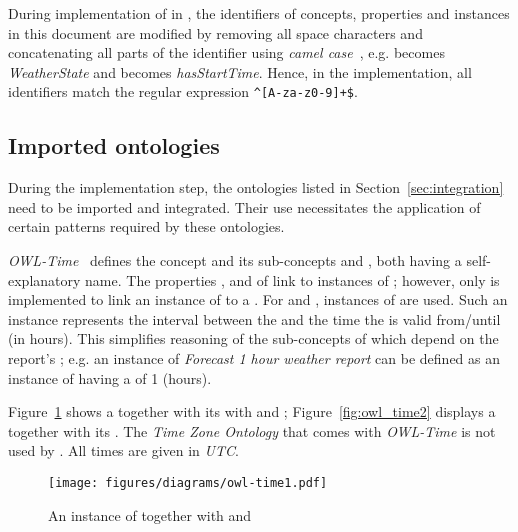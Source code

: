 During implementation of \smarthomeweather in , the identifiers of concepts, properties and instances in this document are modified by removing all space characters and concatenating all parts of the identifier using \emph{camel case}~\cite{CamelCase}, e.g.  becomes \emph{WeatherState} and  becomes \emph{hasStartTime}. Hence, in the  implementation, all identifiers match the regular expression \texttt{\textasciicircum[A-za-z0-9]+\$}.

\subsection{Imported ontologies}
\label{sec:ontology_imports}

During the implementation step, the ontologies listed in Section~\ref{sec:integration} need to be imported and integrated. Their use necessitates the application of certain patterns required by these ontologies.

\vspace{1em}

\emph{OWL-Time}~\cite{owl-time} defines the concept  and its sub-concepts  and , both having a self-explanatory name. The properties ,  and  of  link to instances of ; however, only  is implemented to link an instance of  to a . For  and , instances of  are used. Such an instance represents the interval between the  and the time the  is valid from/until (in hours). This simplifies reasoning of the sub-concepts of  which depend on the report's ; e.g. an instance of \emph{Forecast 1 hour weather report} can be defined as an instance of  having a  of \num{1} (hours).

Figure~\ref{fig:owl_time1} shows a  together with its with  and ; Figure~\ref{fig:owl_time2} displays a  together with its . The \emph{Time Zone Ontology} that comes with \emph{OWL-Time} is not used by \smarthomeweather. All times are given in \emph{UTC}.

\begin{figure}
  \centering
  \texttt{[image: figures/diagrams/owl-time1.pdf]}
  \caption{An instance of  together with  and }
  \label{fig:owl_time1}
\end{figure}

